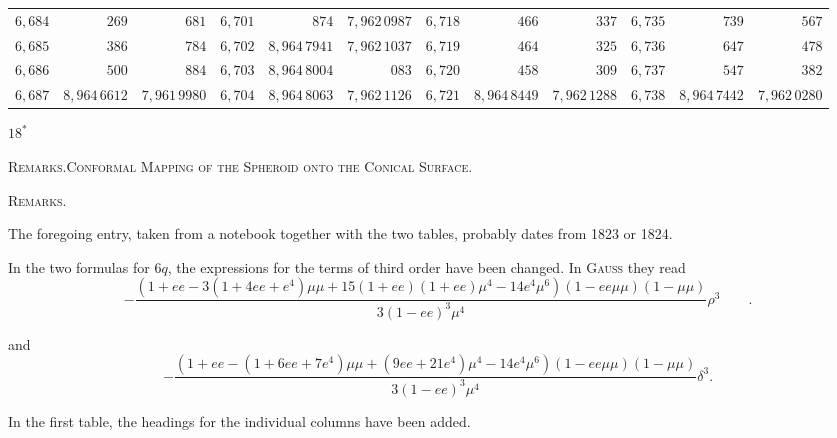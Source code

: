 \begin{center}
\begin{tabular}{|r|r|r||r|r|r||r|r|r||r|r|r|}
$6{,}684$&$269$&$681$&$6{,}701$&$874$&$7{,}962\,0987$&$6{,}718$&$466$&$337$&$6{,}735$&$739$&$567$\\
$6{,}685$&$386$&$784$&$6{,}702$&$8{,}964\,7941$&$7{,}962\,1037$&$6{,}719$&$464$&$325$&$6{,}736$&$647$&$478$\\
$6{,}686$&$500$&$884$&$6{,}703$&$8{,}964\,8004$&$083$&$6{,}720$&$458$&$309$&$6{,}737$&$547$&$382$\\
$6{,}687$&$8{,}964\,6612$&$7{,}961\,9980$&$6{,}704$&$8{,}964\,8063$&$7{,}962\,1126$&$6{,}721$&$8{,}964\,8449$&$7{,}962\,1288$&$6{,}738$&$8{,}964\,7442$&$7{,}962\,0280$\\
\end{tabular}\par\endgroup
\end{center}
\vfill\hfill$18^*$\hspace*{2cm}\par
\clearpage
{}\hfill{\footnotesize\textsc{Remarks.\quad Conformal Mapping of the Spheroid onto the Conical Surface.}}\par\bigskip
\begin{center}\textsc{Remarks.}\end{center}
\begingroup\small
The foregoing entry, taken from a notebook together with the two tables, probably dates from 1823 or 1824.

In the two formulas for $6q$, the expressions for the terms of third order have been changed. In \textsc{Gauss} they read
\begingroup\footnotesize
\[
-\frac{(1+ee-3(1+4ee+e^4)\mu\mu+15(1+ee)(1+ee)\mu^4-14e^4\mu^6)(1-ee\mu\mu)(1-\mu\mu)}{3(1-ee)^3\mu^4}\rho^3\qquad .
\]
\par\endgroup
and
\begingroup\footnotesize
\[
-\frac{(1+ee-(1+6ee+7e^4)\mu\mu+(9ee+21e^4)\mu^4-14e^4\mu^6)(1-ee\mu\mu)(1-\mu\mu)}{3(1-ee)^3\mu^4}\delta^3.
\]
\par\endgroup
In the first table, the headings for the individual columns have been added.

